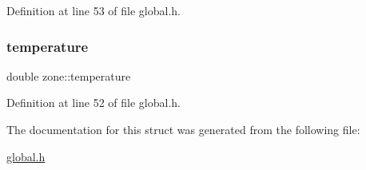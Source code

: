 Definition at line 53 of file global.\+h.

\mbox{\label{structzone_a6e401d100a69c69bfeb00ac281980a2a}} 
\subsubsection{\texorpdfstring{temperature}{temperature}}
{\footnotesize\ttfamily double zone\+::temperature}



Definition at line 52 of file global.\+h.



The documentation for this struct was generated from the following file\+:\begin{DoxyCompactItemize}
\item 
\hyperlink{global_8h}{global.\+h}\end{DoxyCompactItemize}
